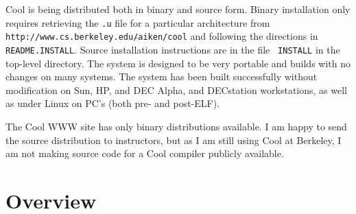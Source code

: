 Cool is being distributed both in binary and source form.  Binary
installation only requires retrieving the {\tt .u} file for a
particular architecture from {\tt http://www.cs.berkeley.edu/$\tilde{
}$aiken/cool} and following the directions in {\tt
README.INSTALL}. Source installation instructions are in the file {\tt
INSTALL} in the top-level directory.  The system is designed to be
very portable and builds with no changes on many systems.  The system
has been built successfully without modification on Sun, HP, and DEC
Alpha, and DECstation workstations, as well as under Linux on PC's
(both pre- and post-ELF).

The Cool WWW site has only binary distributions available.  I am
happy to send the source distribution to instructors, but as I am
still using Cool at Berkeley, I am not making source code for a Cool
compiler publicly available.

\section{Overview}

